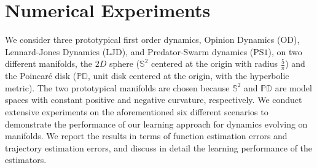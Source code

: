 \documentclass[11pt]{article}
\begin{document}
\section{Numerical Experiments}\label{sec:num_results_SI}
%
We consider three prototypical first order dynamics, Opinion Dynamics (OD), Lennard-Jones Dynamics (LJD), and Predator-Swarm dynamics (PS$1$), on two different manifolds, the $2D$ sphere ($\mathbb{S}^2$ centered at the origin with radius $\frac{5}{\pi}$) and the Poincar\'{e} disk ($ \mathbb{PD} $, unit disk centered at the origin, with the hyperbolic metric).  The two prototypical manifolds are chosen because $\mathbb{S}^2$ and $ \mathbb{PD} $ are model spaces with constant positive and negative curvature, respectively.  We conduct extensive experiments on the aforementioned six different scenarios to demonstrate the performance of our learning approach for dynamics evolving on manifolds.  We report the results in terms of function estimation errors and trajectory estimation errors, and discuss in detail the learning performance of the estimators.
\end{document}
